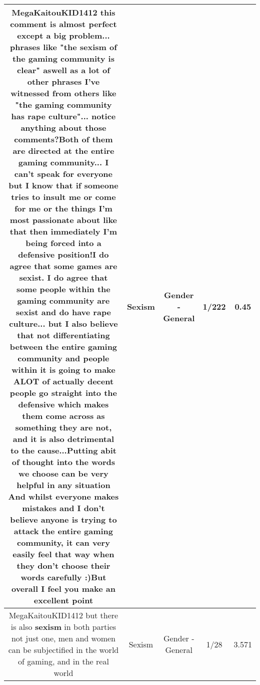 \documentclass[11pt]{article}
\newlength\mylength
\begin{document}
\begin{center}
\begin{longtable}{|C{.65\mylength}|C{.30\mylength}|C{.12\mylength}|C{.12\mylength}|C{.12\mylength}|}
  \small MegaKaitouKID1412 this comment is almost perfect except a big problem... phrases like "the \textbf{sexism} of the gaming community is clear" aswell as a lot of other phrases I've witnessed from others like "the gaming community has rape culture"... notice anything about those comments?Both of them are directed at the entire gaming community... I can't speak for everyone but I know that if someone tries to insult me or come for me or the things I'm most passionate about like that then immediately I'm being forced into a defensive position!I do agree that some games are sexist. I do agree that some people within the gaming community are sexist and do have rape culture... but I also believe that not differentiating between the entire gaming community and people within it is going to make ALOT of actually decent people go straight into the defensive which makes them come across as something they are not, and it is also detrimental to the cause...Putting abit of thought into the words we choose can be very helpful in any situation And whilst everyone makes mistakes and I don't believe anyone is trying to attack the entire gaming community, it can very easily feel that way when they don't choose their words carefully :)But overall I feel you make an excellent point    \normalsize   & Sexism & Gender - General & 1/222 & 0.45 \\  \hline
  \small MegaKaitouKID1412 but there is also \textbf{sexism} in both parties not just one, men and women can be subjectified in the world of gaming, and in the real world\normalsize   & Sexism & Gender - General & 1/28 & 3.571 \\  \hline

\end{longtable}
\end{center}
\end{document}

